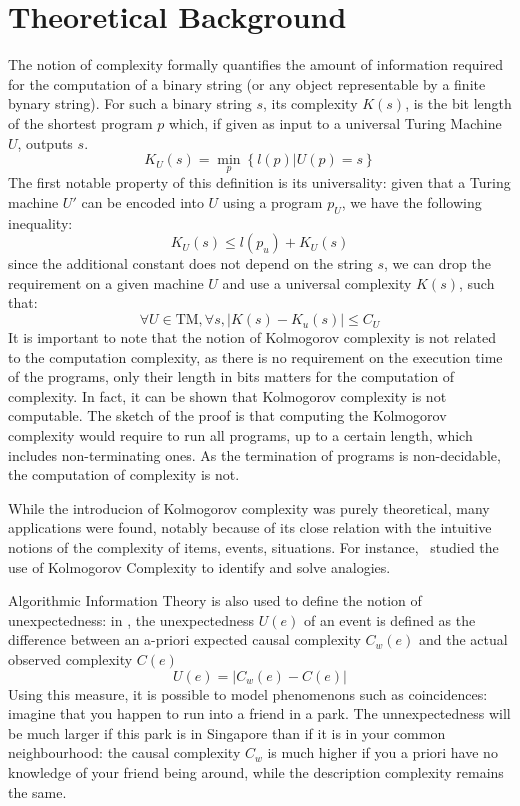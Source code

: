 \documentclass[conference]{IEEEtran}
\begin{document}
\section{Theoretical Background}
\label{sec:theory}
The notion of complexity formally quantifies the amount of information required for the computation of a binary string (or any object representable by a finite bynary string)\cite{kolmogorov_three_1965,li_introduction_2008}. For such a binary string $s$, its complexity $K(s)$, is the bit length of the shortest program $p$ which, if given as input to a universal Turing Machine $U$, outputs $s$.
\begin{equation}
  K_{U}(s) = \min_{p}\left\{l(p)|U(p)=s\right\}
\end{equation}
The first notable property of this definition is its universality: given that a Turing machine $U'$ can be encoded into $U$ using a program $p_{U}$, we have the following inequality:
\begin{equation}
  K_{U}(s) \le l(p_{u}) + K_{U}(s)
\end{equation}
since the additional constant does not depend on the string $s$, we can drop the requirement on a given machine $U$ and use a universal complexity $K(s)$, such that:
\begin{equation}
  \forall U\in\text{TM}, \forall s, |K(s) - K_{u}(s)| \le C_{U}
\end{equation}
It is important to note that the notion of Kolmogorov complexity is not related to the computation complexity, as there is no requirement on the execution time of the programs, only their length in bits matters for the computation of complexity. In fact, it can be shown that Kolmogorov complexity is not computable\cite{li_introduction_2008}. The sketch of the proof is that computing the Kolmogorov complexity would require to run all programs, up to a certain length, which includes non-terminating ones. As the termination of programs is non-decidable, the computation of complexity is not.

While the introducion of Kolmogorov complexity was purely theoretical, many applications were found, notably because of its close relation with the intuitive notions of the complexity of items, events, situations. For instance,~\cite{murena_solving_2020} studied the use of Kolmogorov Complexity to identify and solve analogies.

Algorithmic Information Theory is also used to define the notion of unexpectedness: in \cite{dessalles2011coincidences}, the unexpectedness $U(e)$ of an event is defined as the difference between an a-priori expected causal complexity $C_{w}(e)$ and the actual observed complexity $C(e)$
\begin{equation}
  \label{eq:unexpected}
  U(e) = |C_{w}(e) - C(e)|
\end{equation}
Using this measure, it is possible to model phenomenons such as coincidences: imagine that you happen to run into a friend in a park. The unnexpectedness will be much larger if this park is in Singapore than if it is in your common neighbourhood: the causal complexity $C_{w}$ is much higher if you a priori have no knowledge of your friend being around, while the description complexity remains the same.
\end{document}
